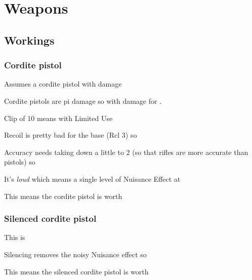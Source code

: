 \begin{character}
\end{character}

\chapter{Weapons}
\label{cha:weapons}

\section{Workings}
\label{sec:workings}



\subsection{Cordite pistol}
\label{sec:cordite-pistol}

Assumes a cordite pistol with  damage

\begin{innateattack}
  \item Cordite pistols are pi damage so  with
     damage for .
  \item Clip of 10 means  with Limited Use
  \item Recoil is pretty bad for the base (Rcl 3) so
  \item Accuracy needs taking down a little to 2 (so that rifles are more
    accurate than pistols) so 
  \item It's \emph{loud} which means a single level of Nuisance Effect at
  \item This means the cordite pistol is worth \InnateAttackTotalPoints{}
\end{innateattack}

\begin{center}
  \InnateAttackBreakdown
\end{center}
\subsection{Silenced cordite pistol}
\label{sec:silenc-cord-pist}

\begin{innateattack}
  \item This is 
  \item Silencing removes the noisy Nuisance effect so
  \item This means the silenced cordite pistol is worth
    \InnateAttackTotalPoints{}
\end{innateattack}


